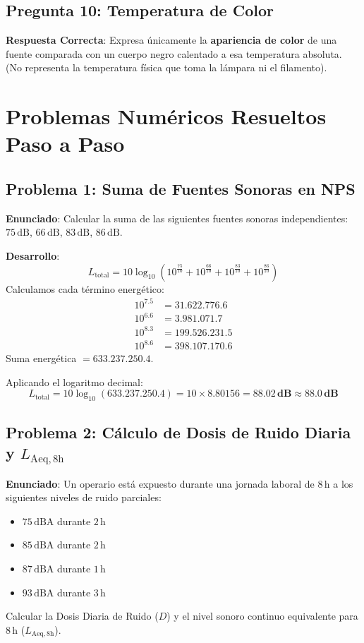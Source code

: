 \documentclass[]{informeutn}
\begin{document}
\subsection{Pregunta 10: Temperatura de Color}
\textbf{Respuesta Correcta}: Expresa únicamente la \textbf{apariencia de color} de una fuente comparada con un cuerpo negro calentado a esa temperatura absoluta. (No representa la temperatura física que toma la lámpara ni el filamento).

\section{Problemas Numéricos Resueltos Paso a Paso}

\subsection{Problema 1: Suma de Fuentes Sonoras en NPS}
\textbf{Enunciado}: Calcular la suma de las siguientes fuentes sonoras independientes: $75\,\text{dB}$, $66\,\text{dB}$, $83\,\text{dB}$, $86\,\text{dB}$.

\textbf{Desarrollo}:
\begin{equation}
L_{\text{total}} = 10 \log_{10} \left( 10^{\frac{75}{10}} + 10^{\frac{66}{10}} + 10^{\frac{83}{10}} + 10^{\frac{86}{10}} \right)
\end{equation}
Calculamos cada término energético:
\begin{align*}
10^{7.5} &= 31.622.776.6 \\
10^{6.6} &= 3.981.071.7 \\
10^{8.3} &= 199.526.231.5 \\
10^{8.6} &= 398.107.170.6
\end{align*}
Suma energética $= 633.237.250.4$.

Aplicando el logaritmo decimal:
\begin{equation}
L_{\text{total}} = 10 \log_{10}(633.237.250.4) = 10 \times 8.80156 = \mathbf{88.02\,\text{dB}} \approx \mathbf{88.0\,\text{dB}}
\end{equation}

\subsection{Problema 2: Cálculo de Dosis de Ruido Diaria y \texorpdfstring{$L_{\text{Aeq},8\text{h}}$}{LAeq,8h}}
\textbf{Enunciado}: Un operario está expuesto durante una jornada laboral de $8\,\text{h}$ a los siguientes niveles de ruido parciales:
\begin{itemize}
    \item $75\,\text{dBA}$ durante $2\,\text{h}$
    \item $85\,\text{dBA}$ durante $2\,\text{h}$
    \item $87\,\text{dBA}$ durante $1\,\text{h}$
    \item $93\,\text{dBA}$ durante $3\,\text{h}$
\end{itemize}
Calcular la Dosis Diaria de Ruido ($D$) y el nivel sonoro continuo equivalente para $8\,\text{h}$ ($L_{\text{Aeq},8\text{h}}$).
\end{document}
